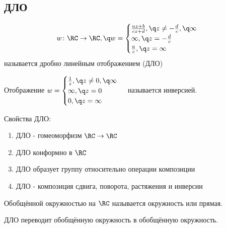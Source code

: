 \subsection{ДЛО}
\begin{definition}
  \[w\colon\RC\to\RC,\q w= 
  \begin{cases}
    \frac{az+b}{cz+d},\q z\neq -\frac{d}{c},\q \infty\\
    \infty,\q z=-\frac{d}{c}\\
    \frac{a}{c},\q z=\infty
  \end{cases}\]
  называется дробно линейным отображением (ДЛО)
\end{definition}
\begin{definition}
  Отображение $w=\begin{cases}
    \frac{1}{z},\q z\neq 0,\q \infty\\
    \infty,\q z=0\\
    0,\q z=\infty
  \end{cases}$ называется инверсией. 
\end{definition}
Свойства ДЛО:
\begin{enumerate}
  \item ДЛО - гомеоморфизм $\RC\to\RC$
  \item ДЛО конформно в $\RC$
  \item ДЛО образует группу относительно операции композиции
  \item ДЛО - композиция сдвига, поворота, растяжения и инверсии
\end{enumerate}
\begin{definition}
  Обобщённой окружностью на $\RC$ называется окружность или прямая. 
\end{definition}
\begin{theorem}
  ДЛО переводит обобщённую окружность в обобщённую окружность.
\end{theorem}
